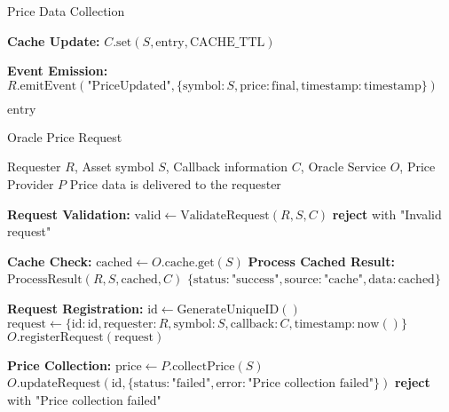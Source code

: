 \begin{tcolorbox}
\begin{protocol}{Price Data Collection}
\begin{algorithmic}[1]
\State \textbf{Cache Update:}
\State $C.\text{set}(S, \text{entry}, \text{CACHE\_TTL})$

\State \textbf{Event Emission:}
\State $R.\text{emitEvent}(\text{"PriceUpdated"}, \{\text{symbol}: S, \text{price}: \text{final}, \text{timestamp}: \text{timestamp}\})$

\State \Return $\text{entry}$
\end{algorithmic}
\end{protocol}
\end{tcolorbox}

\begin{tcolorbox}[
    enhanced,
    colback=blue!5!white,
    colframe=blue!75!black,
    arc=5mm,
    boxrule=1.5pt,
    title=Oracle Price Request Protocol,
    fonttitle=\bfseries,
    coltitle=white,
    attach boxed title to top left={yshift=-2mm, xshift=5mm},
    boxed title style={colback=blue!75!black, rounded corners},
    shadow={2mm}{-2mm}{0mm}{black!50},
    drop fuzzy shadow
]
\begin{protocol}{Oracle Price Request}
\label{prot:oracle-price-request}
\begin{algorithmic}[1]
\Require Requester $R$, Asset symbol $S$, Callback information $C$, Oracle Service $O$, Price Provider $P$
\Ensure Price data is delivered to the requester

\State \textbf{Request Validation:}
\State $\text{valid} \gets \text{ValidateRequest}(R, S, C)$
    \State \textbf{reject} with "Invalid request"
\EndIf

\State \textbf{Cache Check:}
\State $\text{cached} \gets O.\text{cache}.\text{get}(S)$
    \State \textbf{Process Cached Result:}
    \State $\text{ProcessResult}(R, S, \text{cached}, C)$
    \State \Return $\{\text{status}: \text{"success"}, \text{source}: \text{"cache"}, \text{data}: \text{cached}\}$
\EndIf

\State \textbf{Request Registration:}
\State $\text{id} \gets \text{GenerateUniqueID}()$
\State $\text{request} \gets \{\text{id}: \text{id}, \text{requester}: R, \text{symbol}: S, \text{callback}: C, \text{timestamp}: \text{now}()\}$
\State $O.\text{registerRequest}(\text{request})$

\State \textbf{Price Collection:}
\State $\text{price} \gets P.\text{collectPrice}(S)$
    \State $O.\text{updateRequest}(\text{id}, \{\text{status}: \text{"failed"}, \text{error}: \text{"Price collection failed"}\})$
    \State \textbf{reject} with "Price collection failed"
\EndIf


\end{algorithmic}
\end{protocol}
\end{tcolorbox}
